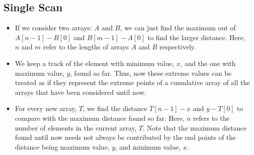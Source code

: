 \subsection{Single Scan}
\begin{itemize}
\item If we consider two arrays: $A$ and $B$, we can just find the maximum out of $A[n−1]-B[0]$ and $B[m−1]-A[0]$ to find the larger distance. Here, $n$ and $m$ refer to the lengths of arrays $A$ and $B$ respectively. 

\item We keep a track of the element with minimum value, $x$, and the one with maximum value, $y$, found so far. Thus, now these extreme values can be treated as if they represent the extreme points of a cumulative array of all the arrays that have been considered until now.
\item For every new array, $T$, we find the distance $T[n−1] - x$ and $y-T[0]$ to compare with the maximum distance found so far. Here, $n$ refers to the number of elements in the current array, $T$. Note that the maximum distance found until now needs not always be contributed by the end points of the distance being maximum value, $y$, and minimum value, $x$.
\end{itemize}